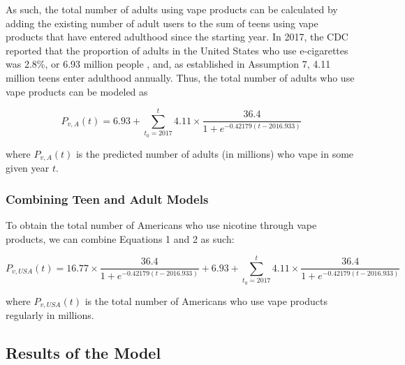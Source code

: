 \documentclass[12pt]{article}
\begin{document}
As such, the total number of adults using vape products can be calculated by adding the existing number of adult users to the sum of teens using vape products that have entered adulthood since the starting year. In 2017, the CDC reported that the proportion of adults in the United States who use e-cigarettes was 2.8\%, or 6.93 million people \cite{cdcAdultTobacco}, and, as established in Assumption 7, 4.11 million teens enter adulthood annually. Thus, the total number of adults who use vape products can be modeled as

\begin{equation}
    P_{v,A}(t) = 6.93 + \sum_{t_0=2017}^{t} 4.11 \times \frac{36.4}{1+e^{-0.42179\left(t-2016.933\right)}}
\end{equation}

\noindent where $P_{v,A}(t)$ is the predicted number of adults (in millions) who vape in some given year $t$.

\subsubsection{Combining Teen and Adult Models}
To obtain the total number of Americans who use nicotine through vape products, we can combine Equations 1 and 2 as such:

\begin{equation}
    P_{v,USA}(t) = 16.77 \times \frac{36.4}{1+e^{-0.42179\left(t-2016.933\right)}} + 6.93 + \sum_{t_0=2017}^{t} 4.11 \times \frac{36.4}{1+e^{-0.42179\left(t-2016.933\right)}}
\end{equation}

\noindent where $P_{v,USA}(t)$ is the total number of Americans who use vape products regularly in millions.

\subsection{Results of the Model}
\end{document}
